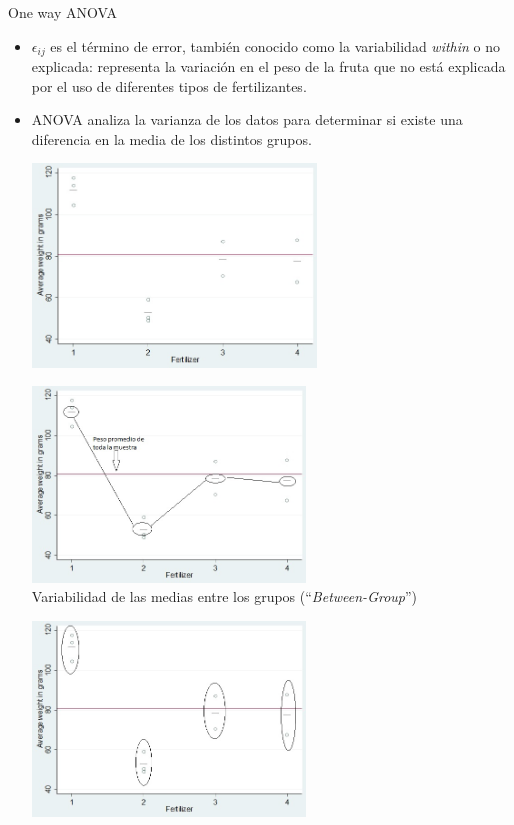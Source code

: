 \documentclass{beamer}
\begin{document}
\begin{frame}[allowframebreaks]{One way ANOVA}
\begin{itemize}
\item $\epsilon_{ij}$ es el término de error, también conocido como la variabilidad \textit{within} o no explicada: representa la variación en el peso de la fruta que no está explicada por el uso de diferentes tipos de fertilizantes.
\item ANOVA analiza la varianza de los datos para determinar si existe una diferencia en la media de los distintos grupos. \\
\begin{center}
\includegraphics[height=5.4cm]{oneway1.jpg}
\end{center}
\begin{center}
\includegraphics[height=5.2cm]{oneway1a.jpg}\\\medskip
Variabilidad de las medias entre los grupos (``\textit{Between-Group}'')
\end{center}
\begin{center}
\includegraphics[height=5.2cm]{oneway1b.jpg}\\\medskip

\end{center}
\end{itemize}
\end{frame}
\end{document}
